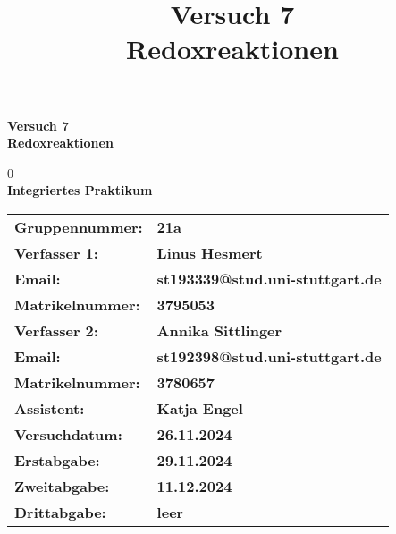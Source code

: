 \documentclass[12pt]{article}
\title{Versuch 7\\ Redoxreaktionen}
\date{}
\author{}
\begin{document}
\newcommand{\supercite}[1]{\textsuperscript{\cite{#1}}}

\begin{titlepage}
    \begin{center}
        \Large\textbf{Versuch 7 \\Redoxreaktionen}

        {\color{white}0}\\

        \small\textbf{Integriertes Praktikum}    
    \end{center}


    \begin{table}[H]
        \centering
        \begin{tabular}{>{\bfseries}l>{\bfseries}l}
            Gruppennummer: & 21a\\
            Verfasser 1: & Linus Hesmert\\
            Email: & st193339@stud.uni-stuttgart.de\\
            Matrikelnummer: & 3795053\\
            Verfasser 2: & Annika Sittlinger\\
            Email: & st192398@stud.uni-stuttgart.de\\
            Matrikelnummer: & 3780657\\
            Assistent: & Katja Engel\\
            Versuchdatum: & 26.11.2024\\
            Erstabgabe: & 29.11.2024\\
            Zweitabgabe: & 11.12.2024\\
            Drittabgabe: & leer \\
        \end{tabular}
    \end{table}

\end{titlepage}





\tableofcontents
\newpage






\end{document}
